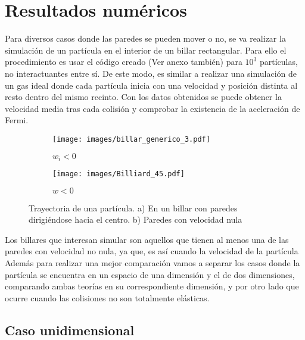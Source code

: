 %

%

\chapter{Resultados numéricos}

Para diversos casos donde las paredes se pueden mover o no, se va realizar la simulación de un partícula en el interior de un billar rectangular. Para ello el procedimiento es usar el código creado \cite{MiCodigo} (Ver anexo también) para \( 10^3 \) partículas, no interactuantes entre sí. De este modo, es similar a realizar una simulación de un gas ideal donde cada partícula inicia con una velocidad y posición distinta al resto dentro del mismo recinto. Con los datos obtenidos se puede obtener la velocidad media tras cada colisión y comprobar la existencia de la aceleración de Fermi.

\begin{figure}[H]
    \begin{subfigure}[b]{0.5\textwidth}
        \centering
        \texttt{[image: images/billar\_generico\_3.pdf]}
        \caption{$w_i<0$}
        \label{fig:a}
    \end{subfigure}
    \hfill
    \begin{subfigure}[b]{0.5\textwidth}
        \centering
        \texttt{[image: images/Billiard\_45.pdf]}
        \caption{$w<0$}
        \label{fig:s}
    \end{subfigure}
    \caption{Trayectoria de una partícula. a) En un billar con paredes dirigiéndose hacia el centro. b) Paredes con velocidad nula}
\end{figure}


Los billares que interesan simular son aquellos que tienen al menos una de las paredes con velocidad no nula, ya que, es así cuando la velocidad de la partícula  Además para realizar una mejor comparación vamos a separar los casos donde la partícula se encuentra en un espacio de una dimensión y el de dos dimensiones, comparando ambas teorías en su correspondiente dimensión, y por otro lado que ocurre cuando las colisiones no son totalmente elásticas.

\section{Caso unidimensional}

